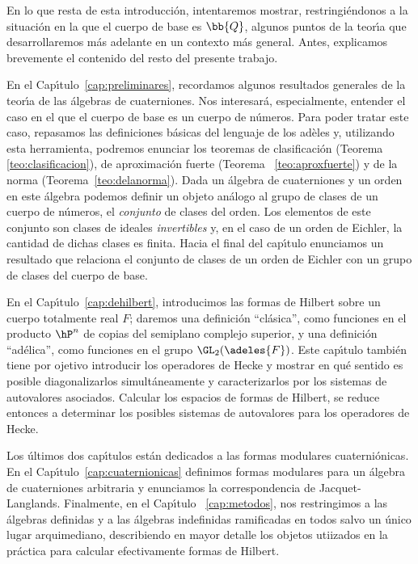 En lo que resta de esta introducci\'{o}n, intentaremos mostrar,
restringi\'{e}ndonos a la situaci\'{o}n en la que el cuerpo de base es
$\bb{Q}$, algunos puntos de la teor\'{\i}a que desarrollaremos m\'{a}s adelante
en un contexto m\'{a}s general. Antes, explicamos brevemente el contenido del
resto del presente trabajo.

En el Cap\'{\i}tulo~\ref{cap:preliminares}, recordamos algunos resultados
generales de la teor\'{\i}a de las \'{a}lgebras de cuaterniones. Nos
interesar\'{a}, especialmente, entender el caso en el que el cuerpo de base es
un cuerpo de n\'{u}meros. Para poder tratar este caso, repasamos las
definiciones b\'{a}sicas del lenguaje de los ad\`{e}les y, utilizando esta
herramienta, podremos enunciar los teoremas de clasificaci\'{o}n (Teorema~%
\ref{teo:clasificacion}), de aproximaci\'{o}n fuerte (Teorema~%
\ref{teo:aproxfuerte}) y de la norma (Teorema~\ref{teo:delanorma}). Dada un
\'{a}lgebra de cuaterniones y un orden en este \'{a}lgebra podemos definir un
objeto an\'{a}logo al grupo de clases de un cuerpo de n\'{u}meros, el
\emph{conjunto} de clases del orden. Los elementos de este conjunto son clases
de ideales \emph{invertibles} y, en el caso de un orden de Eichler, la cantidad
de dichas clases es finita. Hacia el final del cap\'{\i}tulo enunciamos un
resultado que relaciona el conjunto de clases de un orden de Eichler con un
grupo de clases del cuerpo de base.

En el Cap\'{\i}tulo~\ref{cap:dehilbert}, introducimos las formas de Hilbert
sobre un cuerpo totalmente real $F$; daremos una definici\'{o}n
``cl\'{a}sica'', como funciones en el producto $\hP^{n}$ de copias del
semiplano complejo superior, y una definici\'{o}n ``ad\'{e}lica'', como
funciones en el grupo $\GL_{2}(\adeles{F})$. Este cap\'{\i}tulo tambi\'{e}n
tiene por ojetivo introducir los operadores de Hecke y mostrar en qu\'{e}
sentido es posible diagonalizarlos simult\'{a}neamente y caracterizarlos por
los sistemas de autovalores asociados. Calcular los espacios de formas
de Hilbert, se reduce entonces a determinar los posibles sistemas de
autovalores para los operadores de Hecke.

Los \'{u}ltimos dos cap\'{\i}tulos est\'{a}n dedicados a las formas modulares
cuaterni\'{o}nicas. En el Cap\'{\i}tulo~\ref{cap:cuaternionicas} definimos
formas modulares para un \'{a}lgebra de cuaterniones arbitraria y enunciamos la
correspondencia de Jacquet-Langlands. Finalmente, en el Cap\'{\i}tulo~%
\ref{cap:metodos}, nos restringimos a las \'{a}lgebras definidas y a las
\'{a}lgebras indefinidas ramificadas en todos salvo un \'{u}nico lugar
arquimediano, describiendo en mayor detalle los objetos utiizados en la
pr\'{a}ctica para calcular efectivamente formas de Hilbert.
